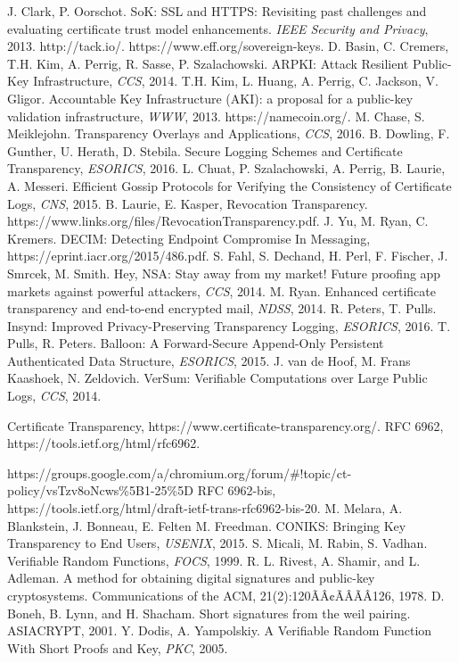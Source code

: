 \documentclass[letterpaper,twocolumn,10pt]{article}
\begin{document}
\begin{thebibliography}{9}

 J. Clark, P. Oorschot. SoK: SSL and HTTPS: Revisiting past challenges and evaluating certificate trust model enhancements. \emph{IEEE Security and Privacy}, 2013.
 http://tack.io/.
 https://www.eff.org/sovereign-keys.
 D. Basin, C. Cremers, T.H. Kim, A. Perrig, R. Sasse, P. Szalachowski. ARPKI: Attack Resilient Public-Key Infrastructure, \emph{CCS}, 2014.
 T.H. Kim, L. Huang, A. Perrig, C. Jackson, V. Gligor. Accountable Key Infrastructure (AKI): a proposal for a public-key validation infrastructure, \emph{WWW}, 2013.
 https://namecoin.org/.
 M. Chase, S. Meiklejohn. Transparency Overlays and Applications, \emph{CCS}, 2016. 
 B. Dowling,  F. Gunther, U. Herath, D. Stebila. Secure Logging Schemes and Certificate Transparency, \emph{ESORICS}, 2016.
 L. Chuat, P. Szalachowski, A. Perrig, B. Laurie, A. Messeri. Efficient Gossip Protocols for Verifying the Consistency of Certificate Logs, \emph{CNS}, 2015. 
 B. Laurie, E. Kasper, Revocation Transparency. https://www.links.org/files/RevocationTransparency.pdf.
 J. Yu, M. Ryan, C. Kremers. DECIM: Detecting Endpoint Compromise In Messaging, https://eprint.iacr.org/2015/486.pdf.
 S. Fahl, S. Dechand, H. Perl, F. Fischer, J. Smrcek, M. Smith. Hey, NSA: Stay away from my market! Future proofing app markets against powerful attackers, \emph{CCS}, 2014.
 M. Ryan. Enhanced certificate transparency and end-to-end encrypted mail, \emph{NDSS}, 2014.
 R. Peters, T. Pulls. Insynd: Improved Privacy-Preserving Transparency Logging, \emph{ESORICS}, 2016.
 T. Pulls, R. Peters. Balloon: A Forward-Secure Append-Only Persistent Authenticated Data Structure, \emph{ESORICS}, 2015.
 J. van de Hoof, M. Frans Kaashoek, N. Zeldovich. VerSum: Verifiable Computations over Large Public Logs, \emph{CCS}, 2014.

 Certificate Transparency, https://www.certificate-transparency.org/.
 RFC 6962, https://tools.ietf.org/html/rfc6962.

 https://groups.google.com/a/chromium.org/forum/\#!topic/ct-policy/vsTzv8oNcws\%5B1-25\%5D
 RFC 6962-bis, https://tools.ietf.org/html/draft-ietf-trans-rfc6962-bis-20.
 M. Melara, A. Blankstein, J. Bonneau, E. Felten M. Freedman. CONIKS: Bringing Key Transparency to End Users, \emph{USENIX}, 2015.
 S. Micali, M. Rabin, S. Vadhan. Verifiable Random Functions, \emph{FOCS}, 1999.
 R. L. Rivest, A. Shamir, and L. Adleman. A method for obtaining digital signatures and public-key cryptosystems. Communications of the ACM, 21(2):120ÃÂ¢ÃÂÃÂ126, 1978.
 D. Boneh, B. Lynn, and H. Shacham. Short signatures from the weil pairing. ASIACRYPT, 2001.
 Y. Dodis, A. Yampolskiy. A Verifiable Random Function With Short Proofs and Key, \emph{PKC}, 2005.


\end{thebibliography}
\end{document}
